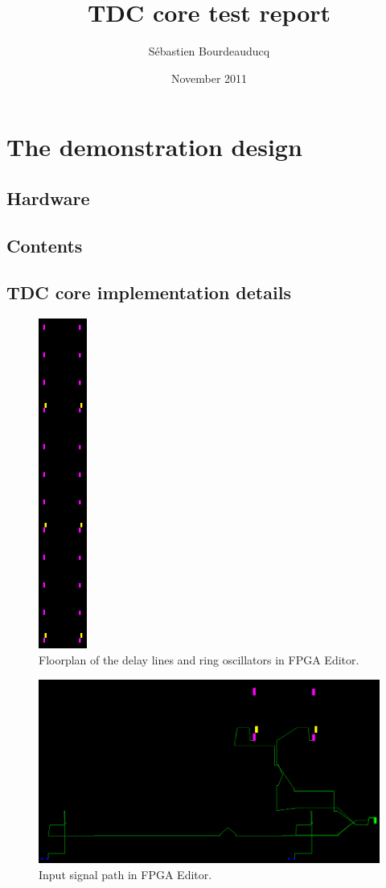 \documentclass[a4paper,11pt]{article}
\title{TDC core test report}
\author{S\'ebastien Bourdeauducq}
\date{November 2011}
\begin{document}
\setlength{\parindent}{0pt}
\setlength{\parskip}{5pt}
\maketitle{}
\section{The demonstration design}
\subsection{Hardware}

\subsection{Contents}

\subsection{TDC core implementation details}

\begin{figure}[h]
\centering
\includegraphics[width=1.6cm]{floorplan.png}
\caption{Floorplan of the delay lines and ring oscillators in FPGA Editor.}
\label{fig:floorplan}
\end{figure}

\begin{figure}[h]
\includegraphics[width=\textwidth]{input_routes.png}
\caption{Input signal path in FPGA Editor.}
\label{fig:inputpath}
\end{figure}
\end{document}

